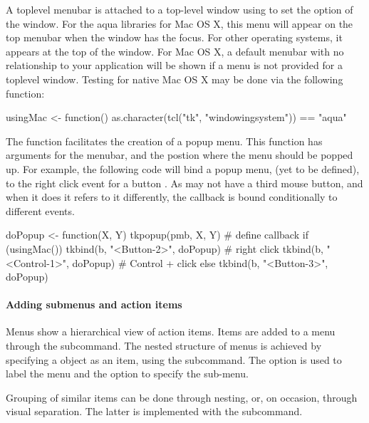 A toplevel menubar is attached to a top-level window using 
to set the  option of the window. For the aqua \TK\/
libraries for Mac OS X, this menu will appear on the top menubar when
the window has the focus. For other operating systems, it appears at
the top of the window. For Mac OS X, a default menubar with no
relationship to your application will be shown if a menu is not
provided for a toplevel window. Testing for native Mac OS X may be done via
the following function:
\begin{Schunk}
\begin{Sinput}
 usingMac <- function()  
   as.character(tcl("tk", "windowingsystem")) == "aqua"
\end{Sinput}
\end{Schunk}

The  function facilitates the creation of a popup
menu.  This function has arguments for the menubar, and the postion
where the menu should be popped up. For example, the following code
will bind a popup menu,  (yet to be defined), to the right click event for a
button . As \OSX\/ may not have a third mouse button, and when
it does it refers to it differently, the callback is bound
conditionally to different events.


\begin{Schunk}
\begin{Sinput}
 doPopup <- function(X, Y) tkpopup(pmb, X, Y) # define callback
 if (usingMac()) {
   tkbind(b, "<Button-2>", doPopup)      # right click
   tkbind(b, "<Control-1>", doPopup)     # Control + click
 } else {
   tkbind(b, "<Button-3>", doPopup)
 }
\end{Sinput}
\end{Schunk}


\paragraph{Adding submenus and action items}
Menus show a hierarchical view of action items. Items are added to a
menu through the  subcommand.  The nested
structure of menus is achieved by specifying a  object as
an item, using the  subcommand. The
option  is used to label the menu and the 
option to specify the sub-menu.

Grouping of similar items can be done through nesting, or, on occasion,
through visual separation. The latter is implemented with the  subcommand.


